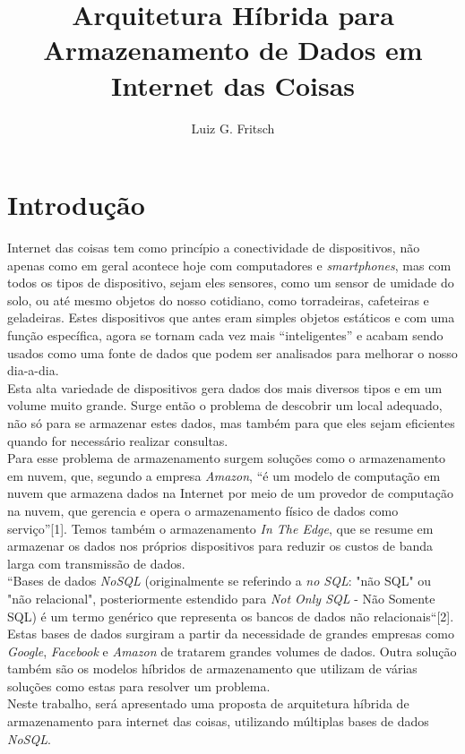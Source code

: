 \documentclass[12pt]{article}
\title{Arquitetura Híbrida para Armazenamento de Dados em Internet das Coisas}
\author{Luiz G. Fritsch\inst{1}}
\begin{document}
 

\maketitle

\begin{abstract}
  
\end{abstract}
     
\begin{resumo} 
  
\end{resumo}


\section{Introdução}

Internet das coisas tem como princípio a conectividade de dispositivos, não apenas como em geral acontece hoje com computadores e \textit{smartphones}, mas com todos os tipos de dispositivo, sejam eles sensores, como um sensor de umidade do solo,  ou até mesmo objetos do nosso cotidiano, como torradeiras, cafeteiras e geladeiras. Estes dispositivos que antes eram simples objetos estáticos e com uma função específica, agora se tornam cada vez mais “inteligentes” e acabam sendo usados como uma fonte de dados que podem ser analisados para melhorar o nosso dia-a-dia.\\
Esta alta variedade de dispositivos gera dados dos mais diversos tipos e em um volume muito grande. Surge então o problema de descobrir um local adequado, não só para se armazenar estes dados, mas também para que eles sejam eficientes quando for necessário realizar consultas.\\
Para esse problema de armazenamento surgem soluções como o armazenamento em nuvem, que, segundo a empresa \textit{Amazon}, “é um modelo de computação em nuvem que armazena dados na Internet por meio de um provedor de computação na nuvem, que gerencia e opera o armazenamento físico de dados como serviço”[1]. Temos também o armazenamento \textit{In The Edge}, que se resume em armazenar os dados nos próprios dispositivos para reduzir os custos de banda larga com transmissão de dados. \\
“Bases de dados \textit{NoSQL} (originalmente se referindo a \textit{no SQL}: "não SQL" ou "não relacional", posteriormente estendido para \textit{Not Only SQL} - Não Somente SQL) é um termo genérico que representa os bancos de dados não relacionais“[2]. Estas bases de dados surgiram a partir da necessidade de grandes empresas como \textit{Google}, \textit{Facebook} e \textit{Amazon} de tratarem grandes volumes de dados.
Outra solução também são os modelos híbridos de armazenamento que utilizam de várias soluções como estas para resolver um problema.\\
Neste trabalho, será apresentado uma proposta de arquitetura híbrida de armazenamento para internet das coisas, utilizando múltiplas bases de dados \textit{NoSQL}.
\end{document}
